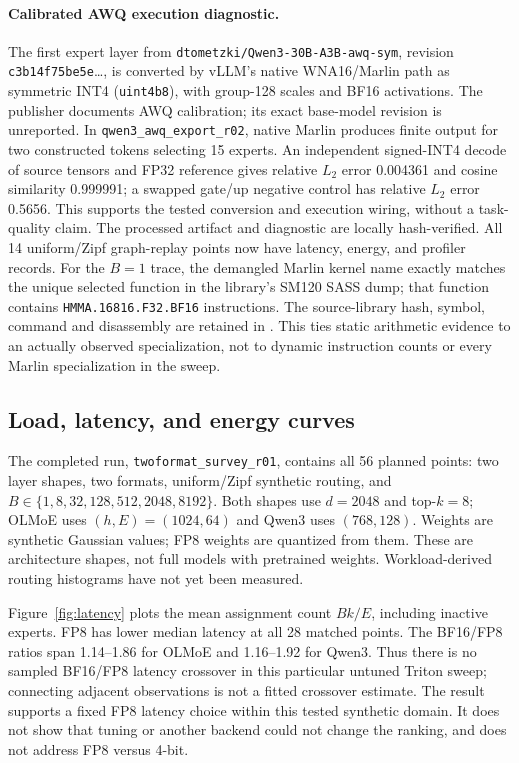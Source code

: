 \documentclass[10pt,twocolumn]{article}
\begin{document}
\paragraph{Calibrated AWQ execution diagnostic.}
The first expert layer from \texttt{dtometzki/Qwen3-30B-A3B-awq-sym},
revision \texttt{c3b14f75be5e}\ldots, is converted by vLLM's native
WNA16/Marlin path as symmetric INT4 (\texttt{uint4b8}), with group-128
scales and BF16 activations. The publisher documents AWQ calibration;
its exact base-model revision is unreported. In
\texttt{qwen3\_awq\_export\_r02}, native Marlin produces finite output for
two constructed tokens selecting 15 experts. An independent signed-INT4
decode of source tensors and FP32 reference gives relative $L_2$ error
0.004361 and cosine similarity 0.999991; a swapped gate/up negative control
has relative $L_2$ error 0.5656. This supports the tested conversion and
execution wiring, without a task-quality claim. The processed artifact and
diagnostic are locally hash-verified. All 14 uniform/Zipf graph-replay points
now have latency, energy, and profiler records.
For the $B=1$ trace, the demangled Marlin kernel name exactly matches the
unique selected function in the library's SM120 SASS dump; that function
contains \texttt{HMMA.16816.}\allowbreak\texttt{F32.BF16} instructions.
The source-library hash, symbol, command and disassembly are retained in
. This ties static arithmetic evidence to an
actually observed specialization, not to dynamic instruction counts or
every Marlin specialization in the sweep.

\subsection{Load, latency, and energy curves}
The completed run, \texttt{twoformat\_survey\_r01}, contains all 56 planned
points: two layer shapes, two formats, uniform/Zipf synthetic routing, and
$B\in\{1,8,32,128,512,2048,8192\}$. Both shapes use $d=2048$ and top-$k=8$;
OLMoE uses $(h,E)=(1024,64)$ and Qwen3 uses $(768,128)$. Weights are synthetic
Gaussian values; FP8 weights are quantized from them. These are architecture
shapes, not full models with pretrained weights. Workload-derived routing
histograms have not yet been measured.

Figure~\ref{fig:latency} plots the mean assignment count $Bk/E$, including
inactive experts. FP8 has lower median latency at all 28 matched points.
The BF16/FP8 ratios span 1.14--1.86 for OLMoE and 1.16--1.92 for Qwen3.
Thus there is no sampled BF16/FP8 latency crossover in this particular
untuned Triton sweep; connecting adjacent observations is not a fitted
crossover estimate. The result supports a fixed FP8 latency choice within
this tested synthetic domain. It does not show that tuning or another
backend could not change the ranking, and does not address FP8 versus 4-bit.
\end{document}
